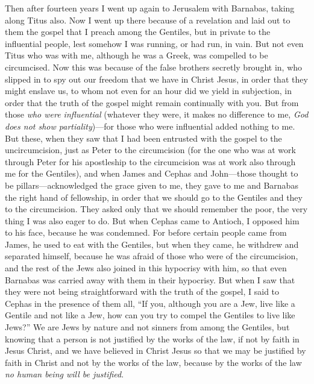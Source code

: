 \begin{biblechapter} %
 Then after fourteen years I went up again to Jerusalem with Barnabas, taking along Titus also.
\verse Now I went up there because of a revelation and laid out to them the gospel that I preach among the Gentiles, but in private to the influential people, lest somehow I was running, or had run, in vain.
\verse But not even Titus who was with me, although he was a Greek, was compelled to be circumcised.
\verse Now this was because of the false brothers secretly brought in, who slipped in to spy out our freedom that we have in Christ Jesus, in order that they might enslave us,
\verse to whom not even for an hour did we yield in subjection, in order that the truth of the gospel might remain continually with you.
\verse But from those \textit{who were influential} (whatever they were, it makes no difference to me, \textit{God does not show partiality})—for those who were influential added nothing to me.
\verse But these, when they saw that I had been entrusted with the gospel to the uncircumcision, just as Peter to the circumcision
\verse (for the one who was at work through Peter for his apostleship to the circumcision was at work also through me for the Gentiles),
\verse and when James and Cephas and John—those thought to be pillars—acknowledged the grace given to me, they gave to me and Barnabas the right hand of fellowship, in order that we should go to the Gentiles and they to the circumcision.
\verse They asked only that we should remember the poor, the very thing I was also eager to do.
 But when Cephas came to Antioch, I opposed him to his face, because he was condemned.
\verse For before certain people came from James, he used to eat with the Gentiles, but when they came, he withdrew and separated himself, because he was afraid of those who were of the circumcision,
\verse and the rest of the Jews also joined in this hypocrisy with him, so that even Barnabas was carried away with them in their hypocrisy.
\verse But when I saw that they were not being straightforward with the truth of the gospel, I said to Cephas in the presence of them all, “If you, although you are a Jew, live like a Gentile and not like a Jew, how can you try to compel the Gentiles to live like Jews?”
 We are Jews by nature and not sinners from among the Gentiles,
\verse but knowing that a person is not justified by the works of the law, if not by faith in Jesus Christ, and we have believed in Christ Jesus so that we may be justified by faith in Christ and not by the works of the law, because by the works of the law \textit{no human being will be justified}.

\end{biblechapter}
